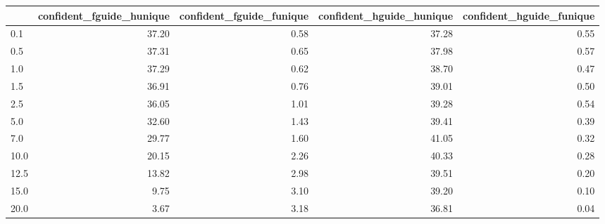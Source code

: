 \begin{tabular}{lrrrr}
\toprule
 & confident_fguide_hunique & confident_fguide_funique & confident_hguide_hunique & confident_hguide_funique \\
\midrule
0.1 & 37.20 & 0.58 & 37.28 & 0.55 \\
0.5 & 37.31 & 0.65 & 37.98 & 0.57 \\
1.0 & 37.29 & 0.62 & 38.70 & 0.47 \\
1.5 & 36.91 & 0.76 & 39.01 & 0.50 \\
2.5 & 36.05 & 1.01 & 39.28 & 0.54 \\
5.0 & 32.60 & 1.43 & 39.41 & 0.39 \\
7.0 & 29.77 & 1.60 & 41.05 & 0.32 \\
10.0 & 20.15 & 2.26 & 40.33 & 0.28 \\
12.5 & 13.82 & 2.98 & 39.51 & 0.20 \\
15.0 & 9.75 & 3.10 & 39.20 & 0.10 \\
20.0 & 3.67 & 3.18 & 36.81 & 0.04 \\
\bottomrule
\end{tabular}
